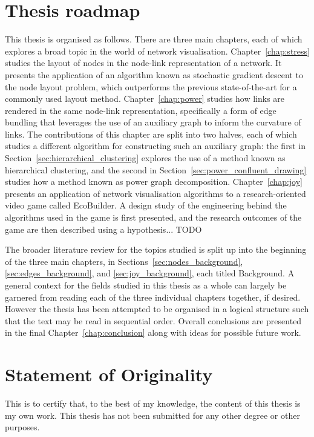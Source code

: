 \section{Thesis roadmap}
This thesis is organised as follows. There are three main chapters, each of which explores a broad topic in the world of network visualisation. Chapter~\ref{chap:stress} studies the layout of nodes in the node-link representation of a network. It presents the  application of an algorithm known as stochastic gradient descent to the node layout problem, which outperforms the previous state-of-the-art for a commonly used layout method.
Chapter~\ref{chap:power} studies how links are rendered in the same node-link representation, specifically a form of edge bundling that leverages the use of an auxiliary graph to inform the curvature of links. The contributions of this chapter are split into two halves, each of which studies a different algorithm for constructing such an auxiliary graph: the first in Section~\ref{sec:hierarchical_clustering} explores the use of a method known as hierarchical clustering, and the second in Section~\ref{sec:power_confluent_drawing} studies how a method known as power graph decomposition.
Chapter~\ref{chap:joy} presents an application of network visualisation algorithms to a research-oriented video game called EcoBuilder. A design study of the engineering behind the algorithms used in the game is first presented, and the research outcomes of the game are then described using a hypothesis... TODO

The broader literature review for the topics studied is split up into the beginning of the three main chapters, in Sections~\ref{sec:nodes_background}, \ref{sec:edges_background}, and \ref{sec:joy_background}, each titled Background. A general context for the fields studied in this thesis as a whole can largely be garnered from reading each of the three individual chapters together, if desired. However the thesis has been attempted to be organised in a logical structure such that the text may be read in sequential order.
Overall conclusions are presented in the final Chapter~\ref{chap:conclusion} along with ideas for possible future work.

\section{Statement of Originality}
This is to certify that, to the best of my knowledge, the content of this thesis is my own work. This thesis has not been submitted for any other degree or other purposes.

